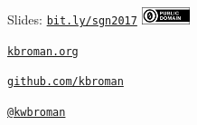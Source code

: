 \documentclass[12pt,t]{beamer}
\begin{document}
\begin{frame}[c]{}

\Large

Slides: \href{http://bit.ly/sgn2017}{\tt bit.ly/sgn2017} \quad
\includegraphics[height=5mm]{Figs/cc-zero.png}

\vspace{7mm}

\href{http://kbroman.org}{\tt \lolit kbroman.org}

\vspace{7mm}

\href{https://github.com/kbroman}{\tt \lolit github.com/kbroman}

\vspace{7mm}

\href{https://twitter.com/kwbroman}{\tt \lolit @kwbroman}


\end{frame}
\end{document}
